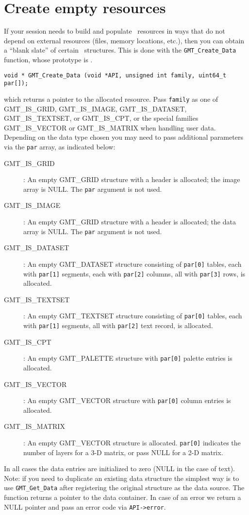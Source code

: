 \documentclass[11pt]{report}
\begin{document}
\section{Create empty resources}
\label{sec:create}

If your session needs to build and populate \GMT\ resources in ways that do
not depend on external resources (files, memory locations, etc.), then you
can obtain a ``blank slate'' of certain \GMT\ structures.  
This is done with the \texttt{GMT\_Create\_Data} function, whose prototype is
.

\begin{verbatim}
void * GMT_Create_Data (void *API, unsigned int family, uint64_t par[]);
\end{verbatim}
which returns a pointer to the allocated resource.
Pass \texttt{family} as one of GMT\_IS\_GRID, GMT\_IS\_IMAGE, GMT\_IS\_DATASET, GMT\_IS\_TEXTSET, or GMT\_IS\_CPT,
or the special families GMT\_IS\_VECTOR or GMT\_IS\_MATRIX when handling user data.
Depending on the data type chosen you may need to pass additional parameters via
the \texttt{par} array, as indicated below:
\begin{description}
	\item [GMT\_IS\_GRID]: An empty GMT\_GRID structure with a header is
	allocated; the image array is NULL.  The \texttt{par} argument is not used.
	\item [GMT\_IS\_IMAGE]: An empty GMT\_GRID structure with a header is
	allocated; the data array is NULL.  The \texttt{par} argument is not used.
	\item [GMT\_IS\_DATASET]: An empty GMT\_DATASET structure consisting of
	\texttt{par[0]} tables, each with \texttt{par[1]} segments, each with
	\texttt{par[2]} columns, all with \texttt{par[3]} rows, is allocated.
	\item [GMT\_IS\_TEXTSET]: An empty GMT\_TEXTSET structure consisting of
	\texttt{par[0]} tables, each with \texttt{par[1]} segments,
	all with \texttt{par[2]} text record, is allocated.
	\item [GMT\_IS\_CPT]: An empty GMT\_PALETTE structure with \texttt{par[0]}
	palette entries is allocated.
	\item [GMT\_IS\_VECTOR]: An empty GMT\_VECTOR structure with \texttt{par[0]}
	column entries is allocated.
	\item [GMT\_IS\_MATRIX]: An empty GMT\_VECTOR structure is allocated.
	\texttt{par[0]} indicates the number of layers for a 3-D matrix, or pass NULL
	for a 2-D matrix.
	
\end{description}
In all cases the data entries are initialized to zero (NULL in the case of text).
Note: if you need to
duplicate an existing data structure the simplest way is to use \texttt{GMT\_Get\_Data}
after registering the original structure as the data source.
The function returns a pointer to the data container. In case of an error we return a
NULL pointer and pass an error code via \texttt{API->error}.
\end{document}
